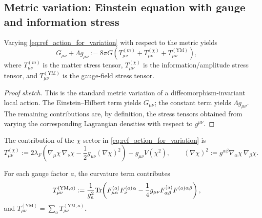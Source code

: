 \subsection{Metric variation: Einstein equation with gauge and information stress}
\label{subsec:einstein_equation_variation}

\begin{theorem}
\label{thm:einstein_equation_total_stress}
Varying \eqref{eq:ref_action_for_variation} with respect to the metric yields
\begin{equation}
\label{eq:einstein_total_stress}
G_{\mu\nu}+\Lambda g_{\mu\nu}
:=8\pi G\left(T^{(m)}_{\mu\nu}+T^{(\chi)}_{\mu\nu}+T^{(\mathrm{YM})}_{\mu\nu}\right),
\end{equation}
where $T^{(m)}_{\mu\nu}$ is the matter stress tensor, $T^{(\chi)}_{\mu\nu}$ is the information/amplitude stress tensor,
and $T^{(\mathrm{YM})}_{\mu\nu}$ is the gauge-field stress tensor.
\end{theorem}

\begin{proof}[Proof sketch]
This is the standard metric variation of a diffeomorphism-invariant local action.
The Einstein--Hilbert term yields $G_{\mu\nu}$; the constant term yields $\Lambda g_{\mu\nu}$.
The remaining contributions are, by definition, the stress tensors obtained from varying the corresponding Lagrangian densities with respect to $g^{\mu\nu}$.
\end{proof}

\begin{proposition}
\label{prop:info_stress_tensor}
The contribution of the $\chi$-sector in \eqref{eq:ref_action_for_variation} is
\begin{equation}
\label{eq:info_stress_tensor}
T^{(\chi)}_{\mu\nu}
:=2\lambda_F\left(\nabla_\mu\chi\,\nabla_\nu\chi-\frac12 g_{\mu\nu}(\nabla\chi)^2\right)
-g_{\mu\nu}V(\chi^2),
\qquad
(\nabla\chi)^2:=g^{\alpha\beta}\nabla_\alpha\chi\,\nabla_\beta\chi.
\end{equation}
\end{proposition}

\begin{proposition}
\label{prop:ym_stress_tensor}
For each gauge factor $a$, the curvature term contributes
\begin{equation}
\label{eq:ym_stress_tensor}
T^{(\mathrm{YM},a)}_{\mu\nu}
:=\frac{1}{g_a^2}\mathrm{Tr}\!\left(F^{(a)}_{\mu\alpha}F^{(a)}_{\nu}{}^{\alpha}-\frac14 g_{\mu\nu}F^{(a)}_{\alpha\beta}F^{(a)\alpha\beta}\right),
\end{equation}
and $T^{(\mathrm{YM})}_{\mu\nu}=\sum_a T^{(\mathrm{YM},a)}_{\mu\nu}$.
\end{proposition}

